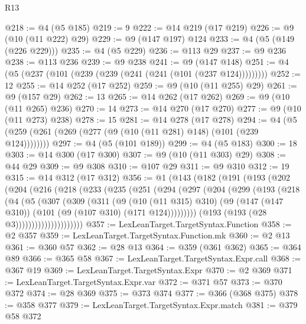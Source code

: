 \begin{lexlean}{R13}
\begin{coremodule}
@218 := @4 (@5 @185)
@219 := 9
@222 := @14 @219 (@17 @219)
@226 := @9 (@10 (@11 @222) @29)
@229 := @9 (@147 @197) @124
@233 := @4 (@5 (@149 (@226 @229)))
@235 := @4 (@5 @229)
@236 := @113 @29
@237 := @9 @236
@238 := @113 @236
@239 := @9 @238
@241 := @9 (@147 @148)
@251 := @4 (@5 (@237 (@101 (@239 (@239 (@241 (@241 (@101 (@237 @124)))))))))
@252 := 12
@255 := @14 @252 (@17 @252)
@259 := @9 (@10 (@11 @255) @29)
@261 := @9 (@157 @29)
@262 := 13
@265 := @14 @262 (@17 @262)
@269 := @9 (@10 (@11 @265) @236)
@270 := 14
@273 := @14 @270 (@17 @270)
@277 := @9 (@10 (@11 @273) @238)
@278 := 15
@281 := @14 @278 (@17 @278)
@294 := @4 (@5 (@259 (@261 (@269 (@277 (@9 (@10 (@11 @281) @148) (@101 (@239 @124))))))))
@297 := @4 (@5 (@101 @189))
@299 := @4 (@5 @183)
@300 := 18
@303 := @14 @300 (@17 @300)
@307 := @9 (@10 (@11 @303) @29)
@308 := @44 @29
@309 := @9 @308
@310 := @107 @29
@311 := @9 @310
@312 := 19
@315 := @14 @312 (@17 @312)
@356 := @1
    (@143
      (@182
        (@191
          (@193
            (@202
              (@204
                (@216
                  (@218
                    (@233
                      (@235
                        (@251
                          (@294
                            (@297
                              (@204
                                (@299
                                  (@193
                                    (@218
                                      (@4
                                        (@5
                                          (@307
                                            (@309
                                              (@311
                                                (@9
                                                  (@10 (@11 @315) @310)
                                                  (@9
                                                    (@147 (@147 @310))
                                                    (@101 (@9 (@107 @310) (@171 @124)))))))))
                                        (@193 (@193 (@28 @3)))))))))))))))))))))
@357 := LexLeanTarget.TargetSyntax.Function
@358 := @2 @357
@359 := LexLeanTarget.TargetSyntax.Function.mk
@360 := @2 @13
@361 := @360 @57
@362 := @28 @13
@364 := @359 (@361 @362)
@365 := @364 @89
@366 := @365 @58
@367 := LexLeanTarget.TargetSyntax.Expr.call
@368 := @367 @19
@369 := LexLeanTarget.TargetSyntax.Expr
@370 := @2 @369
@371 := LexLeanTarget.TargetSyntax.Expr.var
@372 := @371 @57
@373 := @370 @372
@374 := @28 @369
@375 := @373 @374
@377 := @366 (@368 @375)
@378 := @358 @377
@379 := LexLeanTarget.TargetSyntax.Expr.match
@381 := @379 @58 @372

\end{coremodule}
\end{lexlean}
